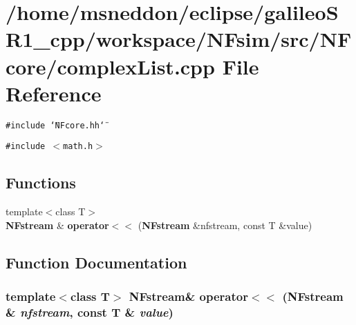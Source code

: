 \section{/home/msneddon/eclipse/galileoSR1\_\-cpp/workspace/NFsim/src/NFcore/complexList.cpp File Reference}
\label{complexList_8cpp}


{\tt \#include \char`\"{}NFcore.hh\char`\"{}}\par
{\tt \#include $<$math.h$>$}\par
\subsection*{Functions}
\begin{CompactItemize}
\item 
{\footnotesize template$<$class T$>$ }\\{\bf NFstream} \& {\bf operator$<$$<$} ({\bf NFstream} \&nfstream, const T \&value)
\end{CompactItemize}


\subsection{Function Documentation}
\subsubsection{\setlength{\rightskip}{0pt plus 5cm}template$<$class T$>$ {\bf NFstream}\& operator$<$$<$ ({\bf NFstream} \& {\em nfstream}, const T \& {\em value})\hspace{0.3cm}{\tt  [inline]}}\label{complexList_8cpp_ef588953052314e1b69285568a59947f}


